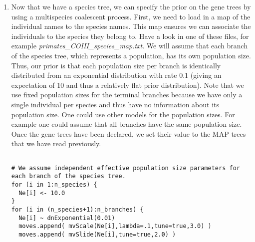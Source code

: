 \begin{enumerate}
{\tt \begin{snugshade*}
\begin{lstlisting}

# read in each gene tree separately
j=1
for ( i in 1:num_loci ) {
    gene_trees[i] <- readTrees("output_GeneTrees/" + locus_names[i] + "_MAP.tree")[1]
    print("Gene tree "+i+ " has "+ gene_trees[i].ntips() + " tips.")
}

# We set the species tree to a good starting value.
# This good starting value is obtained from the Maximum Tree method (Liu, 2006).
# The same method is used in BEST to obtain a good starting species tree.
recTree <- maximumTree(gene_trees)
psi.setValue(recTree)
root.setValue(recTree.rootAge())

write("\t\tProposed starting species tree: ")
write( psi)
write("\t\tWith root age: " + root)

\end{lstlisting}
\end{snugshade*}}

\item Now that we have a species tree, we can specify the prior on the gene trees by using a multispecies coalescent process.
First, we need to load in a map of the individual names to the species names.
This map ensures we can associate the individuals to the species they belong to.
Have a look in one of these files, for example \textit{primates\_COIII\_species\_map.txt}.
We will assume that each branch of the species tree, which represents a population, has its own population size.
Thus, our prior is that each population size per branch is identically distributed from an exponential distribution with rate 0.1 (giving an expectation of 10 and thus a relatively flat prior distribution).
Note that we use fixed population sizes for the terminal branches because we have only a single individual per species and thus have no information about its population size.
One could use other models for the population sizes.
For example one could assume that all branches have the same population size.
Once the gene trees have been declared, we set their value to the MAP trees that we have read previously.

{\tt \begin{snugshade*}
\begin{lstlisting}

# We assume independent effective population size parameters for each branch of the species tree.
for (i in 1:n_species) {
  Ne[i] <- 10.0
}
for (i in (n_species+1):n_branches) {
  Ne[i] ~ dnExponential(0.01)
  moves.append( mvScale(Ne[i],lambda=.1,tune=true,3.0) )
  moves.append( mvSlide(Ne[i],tune=true,2.0) )


\end{lstlisting}
\end{snugshade*}}
\end{enumerate}
